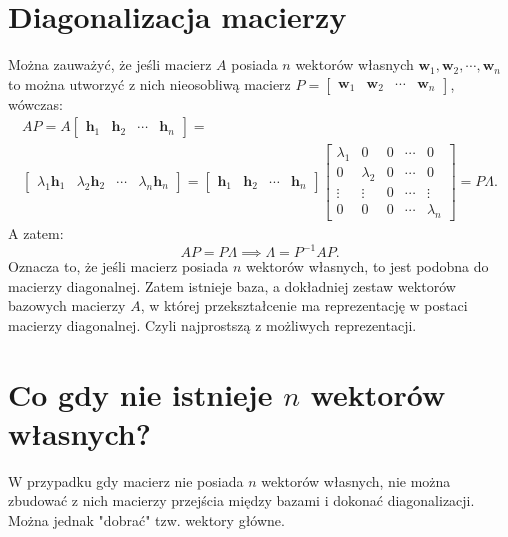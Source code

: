 \documentclass{article}
\begin{document}
\section{Diagonalizacja macierzy}
Można zauważyć, że jeśli macierz $A$ posiada $n$ wektorów własnych $\mathbf{w}_{1}, \mathbf{w}_{2}, \cdots, \mathbf{w}_{n}$ to można utworzyć z nich nieosobliwą macierz $P = \begin{bmatrix} \mathbf{w}_{1} & \mathbf{w}_{2} & \cdots & \mathbf{w}_{n} \end{bmatrix}$, wówczas:
$$
    \begin{array}{c}
        AP =
        A \begin{bmatrix} \mathbf{h}_{1} & \mathbf{h}_{2} & \cdots & \mathbf{h}_{n} \end{bmatrix}
        = \\
        \begin{bmatrix} \lambda_{1}\mathbf{h}_{1} & \lambda_{2}\mathbf{h}_{2} & \cdots & \lambda_{n}\mathbf{h}_{n} \end{bmatrix}
        =
        \begin{bmatrix} \mathbf{h}_{1} & \mathbf{h}_{2} & \cdots & \mathbf{h}_{n} \end{bmatrix}
        \begin{bmatrix}
            \lambda_{1} & 0             & 0 & \cdots & 0\\
            0           & \lambda_{2}   & 0 & \cdots & 0\\
            \vdots      & \vdots        & 0 & \cdots & \vdots\\
            0           & 0             & 0 & \cdots & \lambda_{n}
        \end{bmatrix}
        = P\Lambda.
    \end{array}
$$
A zatem:
$$
    AP = P\Lambda \implies \Lambda = P^{-1}AP.
$$
Oznacza to, że jeśli macierz posiada $n$ wektorów własnych, to jest podobna do macierzy diagonalnej.
Zatem istnieje baza, a dokładniej zestaw wektorów bazowych macierzy $A$, w której przekształcenie ma reprezentację w postaci macierzy diagonalnej.
Czyli najprostszą z możliwych reprezentacji.

\section{Co gdy nie istnieje $n$ wektorów własnych?}
W przypadku gdy macierz nie posiada $n$ wektorów własnych, nie można zbudować z nich macierzy przejścia między bazami i dokonać diagonalizacji.
Można jednak "dobrać" tzw. wektory główne.
\end{document}
